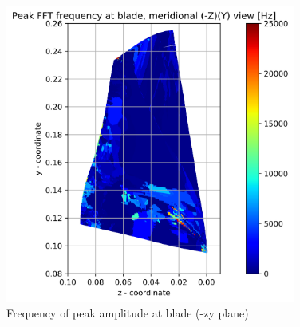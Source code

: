 \begin{figure}[ht]
	\centering
	\includegraphics[width=0.85\textwidth]{Figures/blade-negzy-peak-freq.png}
	\caption{Frequency of peak amplitude at blade (-zy plane)} \label{blade-negzy-peak-freq}
\end{figure}

